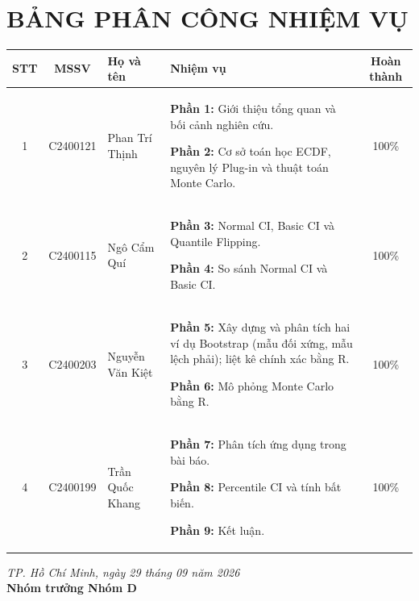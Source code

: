 \documentclass[12pt,a4paper]{article}
\theoremstyle{definition}
\numberwithin{equation}{section}
\begin{document}
	\newpage
	\setcounter{page}{1}

	\section*{BẢNG PHÂN CÔNG NHIỆM VỤ}
	\vspace{0.3cm}

	\begin{center}
		\small
		\renewcommand{\arraystretch}{1.25}
		\setlength{\tabcolsep}{5pt}
		\begin{tabular}{|c|c|p{3.0cm}|p{6.8cm}|c|}
			\hline
			\textbf{STT} & \textbf{MSSV} & \textbf{Họ và tên} & \textbf{Nhiệm vụ} & \textbf{Hoàn thành} \\
			\hline
			1 & C2400121 & Phan Trí Thịnh &
			\textbf{Phần 1:} Giới thiệu tổng quan và bối cảnh nghiên cứu.\par\smallskip
			\textbf{Phần 2:} Cơ sở toán học ECDF, nguyên lý Plug-in và thuật toán Monte Carlo. &
			100\% \\
			\hline
			2 & C2400115 & Ngô Cẩm Quí &
			\textbf{Phần 3:} Normal CI, Basic CI và Quantile Flipping.\par\smallskip
			\textbf{Phần 4:} So sánh Normal CI và Basic CI. &
			100\% \\
			\hline
			3 & C2400203 & Nguyễn Văn Kiệt &
			\textbf{Phần 5:} Xây dựng và phân tích hai ví dụ Bootstrap (mẫu đối xứng, mẫu lệch phải); liệt kê chính xác bằng R.\par\smallskip
			\textbf{Phần 6:} Mô phỏng Monte Carlo bằng R. &
			100\% \\
			\hline
			4 & C2400199 & Trần Quốc Khang &
			\textbf{Phần 7:} Phân tích ứng dụng trong bài báo.\par\smallskip
			\textbf{Phần 8:} Percentile CI và tính bất biến.\par\smallskip
			\textbf{Phần 9:} Kết luận. &
			100\% \\
			\hline
		\end{tabular}
	\end{center}

	\vspace{1cm}

	\begin{flushright}
		\textit{TP. Hồ Chí Minh, ngày 29 tháng 09 năm 2026}\\[0.2cm]
		\textbf{Nhóm trưởng Nhóm D}\\[1.2cm]
	\end{flushright}
\end{document}

